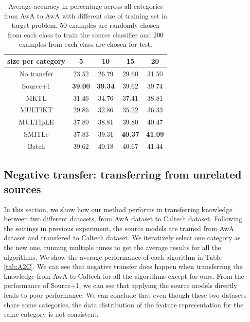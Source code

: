 \begin{table}[htbp]
  \centering
  \caption{Average accuracy in percentage across all categories from AwA to AwA with different size of training set in target problem. 50 examples are randomly chosen from each class to train the source classifier and 200 examples from each class are chosen for test.}
    \begin{tabular}{ccccc}
    \toprule
     size per category    & 5     & 10    & 15    & 20 \\
    \midrule
    No transfer &         23.52  &         26.79  &         29.60  &         31.50  \\
    Source+1    &         \textbf{ 39.00 } &         \textbf{ 39.34 } &         39.62 &         39.74  \\
    MKTL        &         31.46  &         34.76  &         37.41  &         38.81  \\
    MULTIKT     &         29.86  &         32.86  &         35.22  &         36.33  \\
    MULTIpLE    &         37.80  &         38.81  &         39.80  &         40.47  \\
    SMITLe        &        37.83  &         { 39.31 } &         \textbf{ 40.37 } &         \textbf{41.09} \\
        \midrule
    Batch       &         39.62  &         40.18  &         40.67  &         41.44  \\
    \bottomrule
    \end{tabular}%
  \label{tab:A2A}%
\end{table}%



\subsection{Negative transfer: transferring from unrelated sources}
In this section, we show how our method performs in transferring knowledge between two different datasets, from AwA dataset to Caltech dataset. Following the settings in previous experiment, the source models are trained from AwA dataset and transfered to Caltech dataset. We iteratively select one category as the new one, running multiple times to get the average results for all the algorithms. We show the average performance of each algorithm in Table \ref{tab:A2C}. We can see that negative transfer does happen when transferring the knowledge from AwA to Caltech for all the algorithms except for ours. From the performance of Source+1, we can see that applying the source models directly leads to poor performance. We can conclude that even though these two datasets share some categories, the data distribution of the feature representation for the same category is not consistent. 

